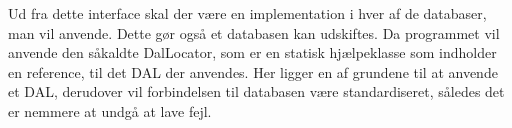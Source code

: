 Ud fra dette interface skal der være en implementation i hver af de databaser, man vil anvende.
Dette gør også et databasen kan udskiftes.
Da programmet vil anvende den såkaldte DalLocator, som er en statisk hjælpeklasse som indholder en reference, til det DAL der anvendes.
Her ligger en af grundene til at anvende et DAL, derudover vil forbindelsen til databasen være standardiseret, således det er nemmere at undgå at lave fejl. 



%
%
%
%


